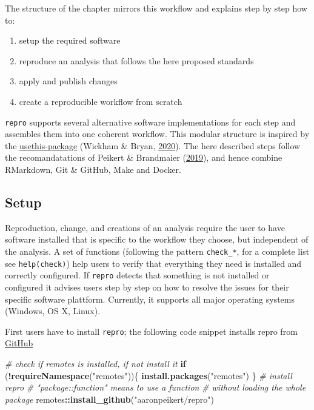 \documentclass[12pt,a4paper,]{article}
\newenvironment{Shaded}{\begin{snugshade}}{\end{snugshade}}
\newcommand{\CommentTok}[1]{\textcolor[rgb]{0.56,0.35,0.01}{\textit{#1}}}
\newcommand{\ControlFlowTok}[1]{\textcolor[rgb]{0.13,0.29,0.53}{\textbf{#1}}}
\newcommand{\KeywordTok}[1]{\textcolor[rgb]{0.13,0.29,0.53}{\textbf{#1}}}
\newcommand{\NormalTok}[1]{#1}
\newcommand{\OperatorTok}[1]{\textcolor[rgb]{0.81,0.36,0.00}{\textbf{#1}}}
\newcommand{\StringTok}[1]{\textcolor[rgb]{0.31,0.60,0.02}{#1}}
\providecommand{\tightlist}{%
  \setlength{\itemsep}{0pt}\setlength{\parskip}{0pt}}
\begin{document}
The structure of the chapter mirrors this workflow and explains step by step how to:

\begin{enumerate}
\def\labelenumi{\arabic{enumi}.}
\tightlist
\item
  setup the required software
\item
  reproduce an analysis that follows the here proposed standards
\item
  apply and publish changes
\item
  create a reproducible workflow from scratch
\end{enumerate}

\texttt{repro} supports several alternative software implementations for each step and assembles them into one coherent workflow.
This modular structure is inspired by the \href{https://usethis.r-lib.org}{usethis-package} (Wickham \& Bryan, \protect\hyperlink{ref-R-usethis}{2020}).
The here described steps follow the recomandatations of Peikert \& Brandmaier (\protect\hyperlink{ref-peikertReproducibleDataAnalysis2019}{2019}), and hence combine RMarkdown, Git \& GitHub, Make and Docker.

\hypertarget{setup}{%
\subsection{Setup}\label{setup}}

Reproduction, change, and creations of an analysis require the user to have software installed that is specific to the workflow they choose, but independent of the analysis.
A set of functions (following the pattern \texttt{check\_*}, for a complete list see \texttt{help(check)}) help users to verify that everything they need is installed and correctly configured.
If \texttt{repro} detects that something is not installed or configured it advises users step by step on how to resolve the issues for their specific software plattform.
Currently, it supports all major operating systems (Windows, OS X, Linux).

First users have to install \texttt{repro}; the following code snippet installs repro from \href{https://github.com/aaronpeikert/repro}{GitHub}

\begin{Shaded}
\begin{Highlighting}[]
\CommentTok{# check if remotes is installed, if not install it}
\ControlFlowTok{if}\NormalTok{ (}\OperatorTok{!}\KeywordTok{requireNamespace}\NormalTok{(}\StringTok{"remotes"}\NormalTok{))\{}
  \KeywordTok{install.packages}\NormalTok{(}\StringTok{"remotes"}\NormalTok{)}
\NormalTok{\}}
\CommentTok{# install repro}
\CommentTok{# "package::function" means to use a function}
\CommentTok{# without loading the whole package}
\NormalTok{remotes}\OperatorTok{::}\KeywordTok{install_github}\NormalTok{(}\StringTok{"aaronpeikert/repro"}\NormalTok{)}
\end{Highlighting}
\end{Shaded}
\end{document}
